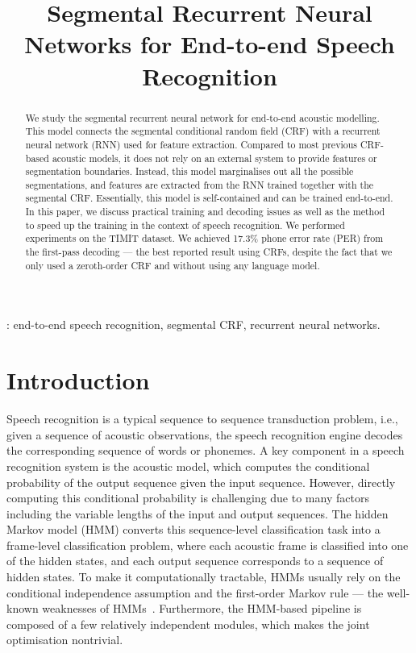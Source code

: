 \documentclass[a4paper]{article}
\title{Segmental Recurrent Neural Networks for End-to-end Speech Recognition}
\begin{document}
\maketitle

\begin{abstract}
We study the segmental recurrent neural network for end-to-end acoustic modelling. This model connects the segmental conditional random field (CRF) with a recurrent neural network (RNN) used for feature extraction. Compared to most previous CRF-based acoustic models, it does not rely on an external system to provide features or segmentation boundaries. Instead, this model marginalises out all the possible segmentations, and features are extracted from the RNN trained together with the segmental CRF. Essentially, this model is self-contained and can be trained end-to-end. In this paper, we discuss practical training and decoding issues as well as the method to speed up the training in the context of speech recognition. We performed experiments on the TIMIT dataset. We achieved 17.3\% phone error rate (PER) from the first-pass decoding --- the best reported result using CRFs, despite the fact that we only used a zeroth-order CRF and without using any language model. 

\end{abstract}
: end-to-end speech recognition, segmental CRF, recurrent neural networks.


\section{Introduction}
\label{sec:intro}

Speech recognition is a typical sequence to sequence transduction problem, i.e., given a sequence of acoustic observations, the speech recognition engine decodes the corresponding sequence of words or phonemes. A key component in a speech recognition system is the acoustic model, which computes the conditional probability of the output sequence given the input sequence. However, directly computing this conditional probability is challenging due to many factors including the variable lengths of the input and output sequences. The hidden Markov model (HMM) converts this sequence-level classification task into a frame-level classification problem, where each acoustic frame is classified into one of the hidden states, and each output sequence corresponds to a sequence of hidden states. To make it computationally tractable, HMMs usually rely on the conditional independence assumption and the first-order Markov rule --- the well-known weaknesses of HMMs~\cite{gillick2011don}. Furthermore, the HMM-based pipeline is composed of a few relatively independent modules, which makes the joint optimisation nontrivial. 
\end{document}
